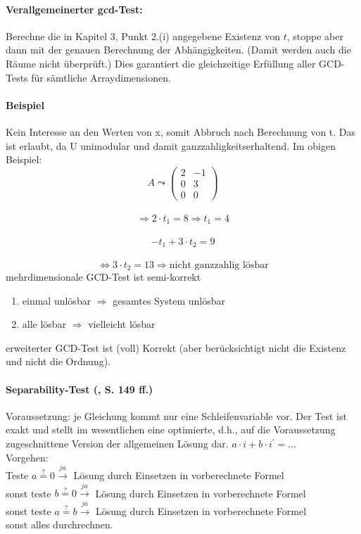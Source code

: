 \smallskip

\paragraph{Verallgemeinerter gcd-Test:} Berechne die in Kapitel 3, Punkt 2.(i)
angegebene Existenz von $t$, stoppe aber dann mit der genauen
Berechnung der Abhängigkeiten. (Damit werden auch die Räume nicht
überprüft.)  Dies garantiert die gleichzeitige Erfüllung aller
GCD-Tests für sämtliche Arraydimensionen.

\paragraph{Beispiel}
Kein Interesse an den Werten von x, somit Abbruch nach Berechnung von t. Das ist erlaubt, da U unimodular und damit \glqq ganzzahligkeitserhaltend\grqq .
Im obigen Beispiel:\\
\[ A \leadsto
\begin{pmatrix}
2 &  -1 \\
0 & 3 \\
0 & 0
\end{pmatrix}
\] \\
\[\Rightarrow 2 \cdot t_1 = 8 \Rightarrow t_1 = 4 \] \\
\[-t_1 + 3 \cdot t_2 = 9 \] \\
\[\Leftrightarrow 3 \cdot t_2 = 13 \Rightarrow \text{nicht ganzzahlig lösbar}
\]
mehrdimensionale GCD-Test ist \glqq semi-korrekt\grqq \\
\begin{enumerate}
  \item einmal unlösbar \( \Rightarrow \) gesamtes System unlösbar
  \item alle lösbar \( \Rightarrow \) vielleicht lösbar
\end{enumerate}
erweiterter GCD-Test ist (voll) Korrekt (aber berücksichtigt nicht die Existenz und nicht die Ordnung).


\paragraph{Separability-Test (\cite{Zima90}, S. 149 ff.)}

Voraussetzung: je Gleichung kommt nur eine Schleifenvariable vor.  Der
Test ist exakt und stellt im wesentlichen eine optimierte, d.h., auf die
Voraussetzung zugeschnittene Version der allgemeinen Lösung dar.
\( a \cdot i + b \cdot i^\prime = \text{...} \) \\
Vorgehen:\\
Teste \(a \stackrel{?}{=} 0 \stackrel{ja}{\rightarrow} \) Lösung durch Einsetzen in vorberechnete Formel\\
sonst teste \(b \stackrel{?}{=} 0 \stackrel{ja}{\rightarrow} \) Lösung durch Einsetzen in vorberechnete Formel\\
sonst teste \(a \stackrel{?}{=} b \stackrel{ja}{\rightarrow} \) Lösung durch Einsetzen in vorberechnete Formel\\
sonst alles durchrechnen.

